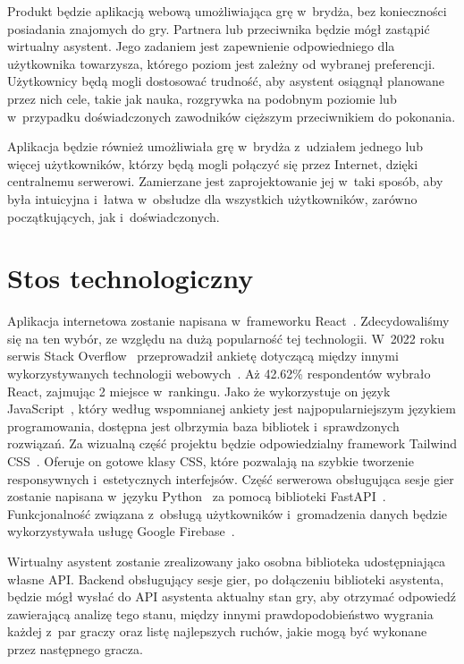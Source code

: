 Produkt będzie aplikacją webową umożliwiająca grę w~brydża,
bez konieczności posiadania znajomych do gry.
Partnera lub przeciwnika będzie mógł zastąpić wirtualny asystent.
Jego zadaniem jest zapewnienie odpowiedniego
dla użytkownika towarzysza, którego poziom jest zależny od wybranej
preferencji. Użytkownicy będą mogli dostosować trudność, aby asystent osiągnął
planowane przez nich cele, takie jak nauka, rozgrywka na podobnym poziomie
lub w~przypadku doświadczonych zawodników cięższym przeciwnikiem do pokonania.

Aplikacja będzie również umożliwiała grę w~brydża z~udziałem jednego lub więcej użytkowników,
którzy będą mogli połączyć się przez Internet, dzięki centralnemu serwerowi.
Zamierzane jest zaprojektowanie jej w~taki sposób, aby była intuicyjna i~łatwa
w~obsłudze dla wszystkich użytkowników, zarówno początkujących, jak
i~doświadczonych.


\section{Stos technologiczny}

Aplikacja internetowa zostanie napisana w~frameworku React~\cite{React}.
Zdecydowaliśmy się na ten wybór, ze względu na dużą popularność tej
technologii. W~2022 roku serwis Stack Overflow~\cite{StackOverflow}
przeprowadził ankietę dotyczącą między innymi wykorzystywanych technologii
webowych~\cite{React-stack}. Aż 42.62\% respondentów wybrało React,
zajmując 2 miejsce w~rankingu. Jako że wykorzystuje on język JavaScript~\cite{JavaScript},
który według wspomnianej ankiety jest najpopularniejszym językiem programowania,
dostępna jest olbrzymia baza bibliotek i~sprawdzonych rozwiązań. Za wizualną
część projektu będzie odpowiedzialny framework Tailwind CSS~\cite{Tailwind}.
Oferuje on gotowe klasy CSS, które pozwalają na szybkie tworzenie responsywnych
i~estetycznych interfejsów. Część serwerowa obsługująca sesje gier zostanie
napisana w~języku Python~\cite{Python} za pomocą biblioteki
FastAPI~\cite{FastAPI}. Funkcjonalność związana z~obsługą użytkowników
i~gromadzenia
danych będzie wykorzystywała usługę Google Firebase~\cite{Firebase}.

Wirtualny asystent zostanie zrealizowany jako osobna biblioteka udostępniająca
własne API. Backend obsługujący sesje gier, po dołączeniu biblioteki asystenta,
będzie mógł wysłać do API asystenta aktualny stan gry, aby otrzymać
odpowiedź zawierającą analizę tego stanu, między innymi
prawdopodobieństwo wygrania każdej z~par graczy oraz listę
najlepszych ruchów, jakie mogą być wykonane przez następnego gracza.

